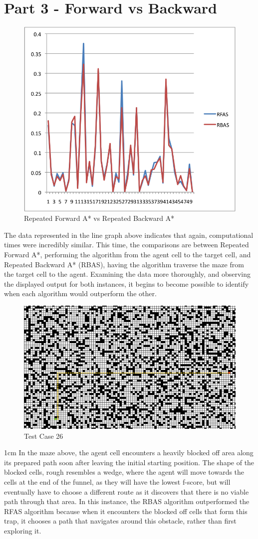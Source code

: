 \documentclass[12pt]{article}
\begin{document}
	\section*{Part 3 - Forward vs Backward}
		\begin{figure}[!htb]
			\centering
			\includegraphics[width=.5\textwidth]{foward_backward.png}
			\caption{Repeated Forward A* vs Repeated Backward A*}
		\end{figure}
		The data represented in the line graph above indicates that again, computational times were incredibly similar.  This time, the comparisons are between Repeated Forward A*, performing the algorithm from the agent cell to the target cell, and Repeated Backward A* (RBAS), having the algorithm traverse the maze from the target cell to the agent.  Examining the data more thoroughly, and observing the displayed output for both instances, it begins to become possible to identify when each algorithm would outperform the other.     
		\onecolumn
		\begin{figure}[!htb]
			\centering
			\includegraphics[width=1\textwidth]{test26.png}
			\caption{Test Case 26}
		\end{figure}{1cm}
		In the maze above, the agent cell encounters a heavily blocked off area along its prepared path soon after leaving the initial starting position.  The shape of the blocked cells, rough resembles a wedge, where the agent will move towards the cells at the end of the funnel, as they will have the lowest f-score, but will eventually have to choose a different route as it discovers that there is no viable path through that area.  In this instance, the RBAS algorithm outperformed the RFAS algorithm because when it encounters the blocked off cells that form this trap, it chooses a path that navigates around this obstacle, rather than first exploring it.
		
\end{document}
